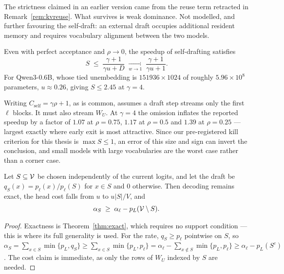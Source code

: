 \begin{remark}
The strictness claimed in an earlier version came from the reuse term retracted
in Remark~\ref{rem:kvreuse}. What survives is weak dominance. Not modelled, and
further favouring the self-draft: an external draft occupies additional resident
memory and requires vocabulary alignment between the two models.
\end{remark}

\begin{corollary}
\label{cor:ceiling}
Even with perfect acceptance and $\rho \to 0$, the speedup of self-drafting
satisfies
\begin{equation}
  S \;\le\; \frac{\gamma+1}{\gamma u + D} \;\xrightarrow[w \to 1]{}\;
  \frac{\gamma+1}{\gamma u + 1} .
\end{equation}
For Qwen3-0.6B, whose tied unembedding is $151936 \times 1024$ of roughly
$5.96\times10^{8}$ parameters, $u \approx 0.26$, giving $S \le 2.45$ at
$\gamma = 4$.
\end{corollary}

\begin{remark}
\label{rem:headmatters}
Writing $C_{\mathrm{self}} = \gamma\rho + 1$, as is common, assumes a draft step
streams only the first $\ell$ blocks. It must also stream $W_U$. At
$\gamma = 4$ the omission inflates the reported speedup by a factor of $1.07$ at
$\rho = 0.75$, $1.17$ at $\rho = 0.5$ and $1.39$ at $\rho = 0.25$ --- largest
exactly where early exit is most attractive. Since our pre-registered kill
criterion for this thesis is $\max S \le 1$, an error of this size and sign can
invert the conclusion, and small models with large vocabularies are the worst
case rather than a corner case.
\end{remark}

\begin{corollary}
\label{cor:shortlist}
Let $S \subseteq \mathcal{V}$ be chosen independently of the current logits, and let
the draft be $q_S(x) = p_\ell(x)/p_\ell(S)$ for $x \in S$ and $0$ otherwise.
Then decoding remains exact, the head cost falls from $u$ to $u|S|/V$, and
\begin{equation}
  \alpha_S \;\ge\; \alpha_\ell - p_L(\mathcal{V} \setminus S) .
\end{equation}
\end{corollary}

\begin{proof}
Exactness is Theorem~\ref{thm:exact}, which requires no support condition --- this
is where its full generality is used. For the rate, $q_S \ge p_\ell$ pointwise on
$S$, so
$\alpha_S = \sum_{x\in S}\min\{p_L,q_S\} \ge \sum_{x \in S}\min\{p_L,p_\ell\}
 = \alpha_\ell - \sum_{x \notin S}\min\{p_L,p_\ell\} \ge \alpha_\ell - p_L(S^c)$.
The cost claim is immediate, as only the rows of $W_U$ indexed by $S$ are needed.
\end{proof}

